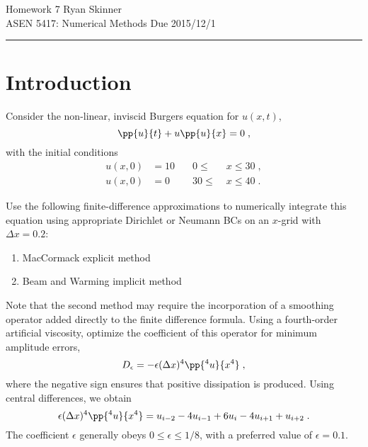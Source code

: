 \documentclass[11pt]{article}
\begin{document}
\pagestyle{fancyplain}
\lhead{}
\chead{}
\rhead{}
\cfoot{\hrule \thepage}

\noindent
{\Large Homework 7}
\hfill
{\large Ryan Skinner}
\\[0.5ex]
{\large ASEN 5417: Numerical Methods}
\hfill
{\large Due 2015/12/1}\\
\hrule
\vspace{6pt}

\section{Introduction} %

Consider the non-linear, inviscid Burgers equation for $u(x,t)$,
\begin{equation}
\pp{u}{t} + u \pp{u}{x} = 0
\;,
\end{equation}
with the initial conditions
\begin{equation}
\begin{aligned}
u(x,0) &= 10 &\quad 0  \le\; &x \le 30 \;, \\
u(x,0) &= 0  &\quad 30 \le\; &x \le 40 \;.
\end{aligned}
\end{equation}

Use the following finite-difference approximations to numerically integrate this equation using appropriate Dirichlet or Neumann BCs on an $x$-grid with $\Delta x = 0.2$:
\begin{enumerate}
\item MacCormack explicit method
\item Beam and Warming implicit method
\end{enumerate}

Note that the second method  may require the incorporation of a smoothing operator added directly to the finite difference formula. Using a fourth-order artificial viscosity, optimize the coefficient of this operator for minimum amplitude errors,
\begin{equation}
D_\epsilon = - \epsilon(\Delta x)^4 \pp{^4 u}{x^4}
\;,
\end{equation}
where the negative sign ensures that positive dissipation is produced. Using central differences, we obtain
\begin{equation}
\epsilon(\Delta x)^4 \pp{^4 u}{x^4} = u_{i-2} -4u_{i-1} +6u_i -4u_{i+1} +u_{i+2}
\;.
\end{equation}
The coefficient $\epsilon$ generally obeys $0 \le \epsilon \le 1/8$, with a preferred value of $\epsilon = 0.1$.
\end{document}
